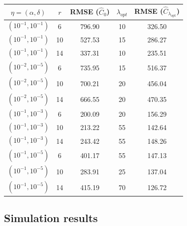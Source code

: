 \documentclass[oupdraft]{bio}
\begin{document}
\begin{table}[h]
\centering
\begin{tabular}{ccccc}
  \hline
$\eta = (\alpha, \delta)$ & $r$ & RMSE ($\widehat{C}_{0}$) & $\lambda_{opt}$ & RMSE ($\widehat{C}_{\lambda_{ \text{opt}}}$) \\
  \hline
$\left(10^{-1}, 10^{-1}\right)$ &   6 & 796.90 &  10 & 326.50 \\
$\left(10^{-1}, 10^{-1}\right)$ &  10 & 527.53 &  15 & 286.27 \\
  $\left(10^{-1}, 10^{-1}\right)$ &  14 & 337.31 &  10 & 235.51 \\
  $\left(10^{-2}, 10^{-5}\right)$ &   6 & 735.95 &  15 & 516.37 \\
  $\left(10^{-2}, 10^{-5}\right)$ &  10 & 700.21 &  20 & 456.04 \\
  $\left(10^{-2}, 10^{-5}\right)$ &  14 & 666.55 &  20 & 470.35 \\
  $\left(10^{-1}, 10^{-3}\right)$ &   6 & 200.09 &  20 & 156.29 \\
  $\left(10^{-1}, 10^{-3}\right)$ &  10 & 213.22 &  55 & 142.64 \\
  $\left(10^{-1}, 10^{-3}\right)$ &  14 & 243.42 &  55 & 148.26 \\
  $\left(10^{-1}, 10^{-5}\right)$ &   6 & 401.17 &  55 & 147.13 \\
  $\left(10^{-1}, 10^{-5}\right)$ &  10 & 283.91 &  25 & 137.04 \\
  $\left(10^{-1}, 10^{-5}\right)$ &  14 & 415.19 &  70 & 126.72 \\
   \hline
\end{tabular}
\end{table}

\subsection{Simulation results}
\end{document}
